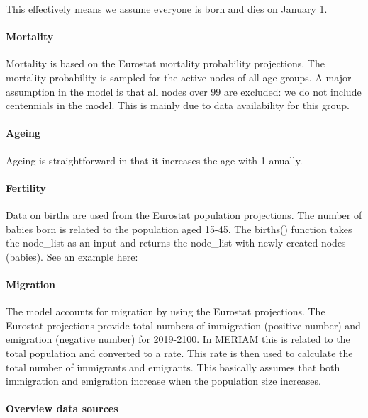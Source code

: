 \documentclass[
]{article}
\begin{document}
This effectively means we assume everyone is born and dies on January 1.

\hypertarget{population_mortality}{%
\paragraph{Mortality}\label{population_mortality}}

Mortality is based on the Eurostat mortality probability projections. The mortality probability is sampled for the active nodes of all age groups. A major assumption in the model is that all nodes over 99 are excluded: we do not include centennials in the model. This is mainly due to data availability for this group.

\hypertarget{ageing}{%
\paragraph{Ageing}\label{ageing}}

Ageing is straightforward in that it increases the age with 1 anually.

\hypertarget{fertility}{%
\paragraph{Fertility}\label{fertility}}

Data on births are used from the Eurostat population projections. The number of babies born is related to the population aged 15-45. The births() function takes the node\_list as an input and returns the node\_list with newly-created nodes (babies). See an example here:

\hypertarget{migration}{%
\paragraph{Migration}\label{migration}}

The model accounts for migration by using the Eurostat projections. The Eurostat projections provide total numbers of immigration (positive number) and emigration (negative number) for 2019-2100. In MERIAM this is related to the total population and converted to a rate. This rate is then used to calculate the total number of immigrants and emigrants. This basically assumes that both immigration and emigration increase when the population size increases.

\hypertarget{overview-data-sources}{%
\paragraph{Overview data sources}\label{overview-data-sources}}
\end{document}

